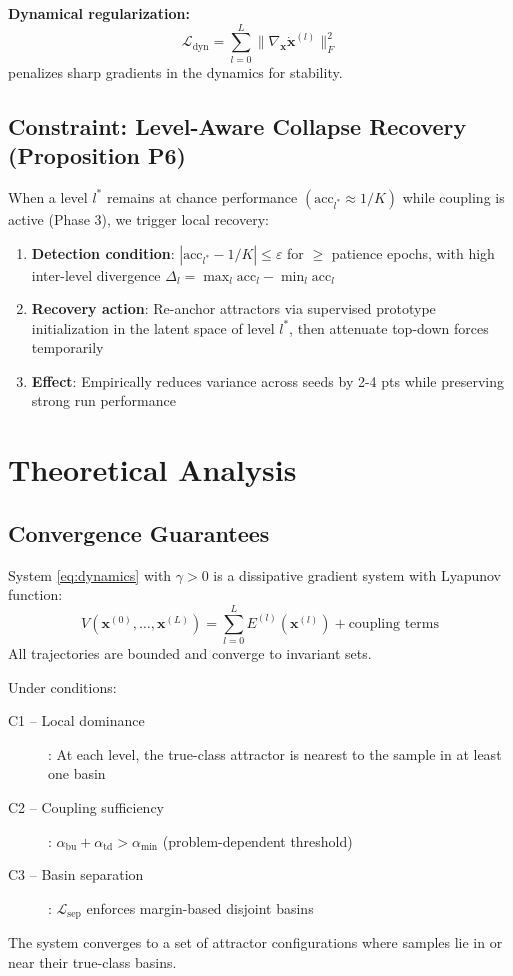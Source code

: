 \documentclass[11pt,a4paper]{article}
\begin{document}
\textbf{Dynamical regularization:}
\begin{equation}
\mathcal{L}_{\text{dyn}} = \sum_{l=0}^{L} \|\nabla_{\mathbf{x}} \dot{\mathbf{x}}^{(l)}\|_F^2
\end{equation}
penalizes sharp gradients in the dynamics for stability.

\subsection{Constraint: Level-Aware Collapse Recovery (Proposition P6)}

When a level $l^*$ remains at chance performance $(\text{acc}_{l^*} \approx 1/K)$ while coupling is active (Phase 3), we trigger local recovery:

\begin{enumerate}
  \item \textbf{Detection condition}: $|\text{acc}_{l^*} - 1/K| \le \varepsilon$ for $\ge $ patience epochs, with high inter-level divergence $\Delta_l = \max_l \text{acc}_l - \min_l \text{acc}_l$
  \item \textbf{Recovery action}: Re-anchor attractors via supervised prototype initialization in the latent space of level $l^*$, then attenuate top-down forces temporarily
  \item \textbf{Effect}: Empirically reduces variance across seeds by 2-4 pts while preserving strong run performance
\end{enumerate}

\section{Theoretical Analysis}

\subsection{Convergence Guarantees}

\begin{proposition}
System \eqref{eq:dynamics} with $\gamma > 0$ is a dissipative gradient system with Lyapunov function:
$$V(\mathbf{x}^{(0)}, \ldots, \mathbf{x}^{(L)}) = \sum_{l=0}^{L} E^{(l)}(\mathbf{x}^{(l)}) + \text{coupling terms}$$
All trajectories are bounded and converge to invariant sets.
\end{proposition}

\begin{theorem}
Under conditions:
\begin{description}
  \item[C1 -- Local dominance]: At each level, the true-class attractor is nearest to the sample in at least one basin
  \item[C2 -- Coupling sufficiency]: $\alpha_{\text{bu}} + \alpha_{\text{td}} > \alpha_{\min}$ (problem-dependent threshold)
  \item[C3 -- Basin separation]: $\mathcal{L}_{\text{sep}}$ enforces margin-based disjoint basins
\end{description}
The system converges to a set of attractor configurations where samples lie in or near their true-class basins.
\end{theorem}
\end{document}
